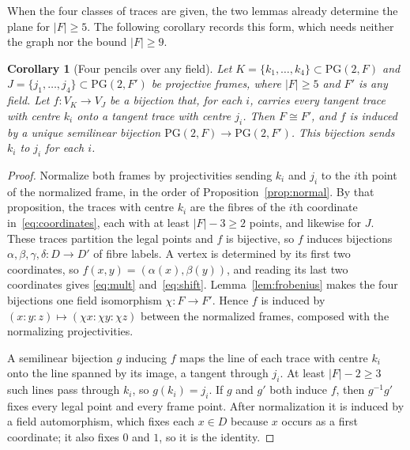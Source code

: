 \documentclass[11pt]{article}
\newtheorem{corollary}[theorem]{Corollary}
\theoremstyle{definition}
\theoremstyle{remark}
\newcommand{\PG}{\mathrm{PG}}
\begin{document}
When the four classes of traces are given, the two lemmas already
determine the plane for $|F|\ge5$. The following corollary records this
form, which needs neither the graph nor the bound $|F|\ge9$.

\begin{corollary}[Four pencils over any field]\label{cor:four-pencils}
Let $K=\{k_1,\dots,k_4\}\subset\PG(2,F)$ and
$J=\{j_1,\dots,j_4\}\subset\PG(2,F')$ be projective frames, where
$|F|\ge5$ and $F'$ is any field. Let $f:V_K\to V_J$ be a bijection that,
for each $i$, carries every tangent trace with centre $k_i$ onto a tangent
trace with centre $j_i$. Then $F\cong F'$, and $f$ is induced by a unique
semilinear bijection $\PG(2,F)\to\PG(2,F')$. This bijection sends $k_i$
to $j_i$ for each $i$.
\end{corollary}

\begin{proof}
Normalize both frames by projectivities sending $k_i$ and $j_i$ to the
$i$th point of the normalized frame, in the order of
Proposition~\ref{prop:normal}. By that proposition, the traces with
centre $k_i$ are the fibres of the $i$th coordinate
in~\eqref{eq:coordinates}, each with at least $|F|-3\ge2$ points, and
likewise for $J$. These traces partition the legal points and $f$ is
bijective, so $f$ induces bijections $\alpha,\beta,\gamma,\delta:D\to D'$
of fibre labels. A vertex is determined by its first two coordinates, so
$f(x,y)=(\alpha(x),\beta(y))$, and reading its last two coordinates gives
\eqref{eq:mult} and~\eqref{eq:shift}. Lemma~\ref{lem:frobenius} makes
the four bijections one field isomorphism $\chi:F\to F'$. Hence $f$ is
induced by $(x:y:z)\mapsto(\chi x:\chi y:\chi z)$ between the normalized
frames, composed with the normalizing projectivities.

A semilinear bijection $g$ inducing $f$ maps the line of each trace with
centre $k_i$ onto the line spanned by its image, a tangent through $j_i$.
At least $|F|-2\ge3$ such lines pass through $k_i$, so $g(k_i)=j_i$. If
$g$ and $g'$ both induce $f$, then $g^{-1}g'$ fixes every legal point and
every frame point. After normalization it is induced by a field
automorphism, which fixes each $x\in D$ because $x$ occurs as a first
coordinate; it also fixes $0$ and $1$, so it is the identity.
\end{proof}
\end{document}
